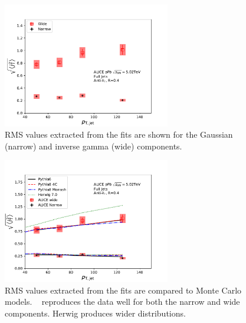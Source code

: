 \begin{figure}[htb]
\centering
\includegraphics[width=0.65\textwidth]{figures/results/RMSWithSystematics}
\caption{RMS values extracted from the fits are shown for the Gaussian (narrow) and inverse gamma (wide) components.}
\label{fig:rms}
\end{figure}

\begin{figure}[htb]
\centering
\includegraphics[width=0.65\textwidth]{figures/results/RMSWithSystematics_Pythia}
\caption{RMS values extracted from the fits are compared to Monte Carlo models. \pythia~ reproduces the data well for both the narrow and wide components. Herwig produces wider distributions. }
\label{fig:pythia}
\end{figure}
\FloatBarrier
